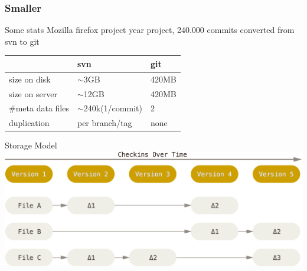 \begin{frame}
\frametitle{Smaller}
\begin{block}{Some stats}
		Mozilla firefox project  year project, 240.000 commits \newline
		converted from svn to git \newline \newline
		\begin{tabular}{l | l | l}
			 & svn & git \\
			\hline
			size on disk & $\sim$3GB & 420MB \\
			size on server & $\sim$12GB & 420MB \\
			\#meta data files & $\sim$240k\scriptsize(1/commit) & 2 \\
			duplication & per branch/tag & none\\
		\end{tabular}
	\end{block}
\end{frame}

\begin{frame}
	\begin{block}{Storage Model}
		\includegraphics[width=\textwidth]{./images/deltaStorage.png}
	\end{block}
\end{frame}
